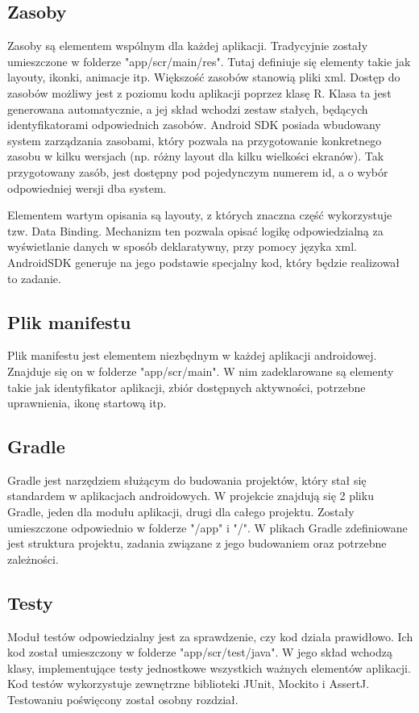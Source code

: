 \documentclass	{xmgr}
\begin{document}
\subsection{Zasoby}
Zasoby są elementem wspólnym dla każdej aplikacji. Tradycyjnie zostały umieszczone w folderze "app/scr/main/res". Tutaj definiuje się elementy takie jak layouty, ikonki, animacje itp. Większość zasobów stanowią pliki xml. Dostęp do zasobów możliwy jest z poziomu kodu aplikacji poprzez klasę R. Klasa ta jest generowana automatycznie, a jej skład wchodzi zestaw stałych, będących identyfikatorami odpowiednich zasobów. Android SDK posiada wbudowany system zarządzania zasobami, który pozwala na przygotowanie konkretnego zasobu w kilku wersjach (np. różny layout dla kilku wielkości ekranów). Tak przygotowany zasób, jest dostępny pod pojedynczym numerem id, a o wybór odpowiedniej wersji dba system.

Elementem wartym opisania są layouty, z których znaczna część wykorzystuje tzw. Data Binding. Mechanizm ten pozwala opisać logikę odpowiedzialną za wyświetlanie danych w sposób deklaratywny, przy pomocy języka xml. AndroidSDK generuje na jego podstawie specjalny kod, który będzie realizował to zadanie. 

\subsection{Plik manifestu}
Plik manifestu jest elementem niezbędnym w każdej aplikacji androidowej. Znajduje się on w folderze "app/scr/main". W nim zadeklarowane są elementy takie jak identyfikator aplikacji, zbiór dostępnych aktywności, potrzebne uprawnienia, ikonę startową itp.

\subsection{Gradle}
Gradle jest narzędziem służącym do budowania projektów, który stał się standardem w aplikacjach androidowych. W projekcie znajdują się 2 pliku Gradle, jeden dla modułu aplikacji, drugi dla całego projektu. Zostały umieszczone odpowiednio w folderze "/app" i "/". W plikach Gradle zdefiniowane jest struktura projektu, zadania związane z jego budowaniem oraz potrzebne zależności.

\subsection{Testy}
Moduł testów odpowiedzialny jest za sprawdzenie, czy kod działa prawidłowo. Ich kod został umieszczony w folderze "app/scr/test/java". W jego skład wchodzą klasy, implementujące testy jednostkowe wszystkich ważnych elementów aplikacji. Kod testów wykorzystuje zewnętrzne biblioteki JUnit, Mockito i AssertJ. Testowaniu poświęcony został osobny rozdział.
\end{document}
